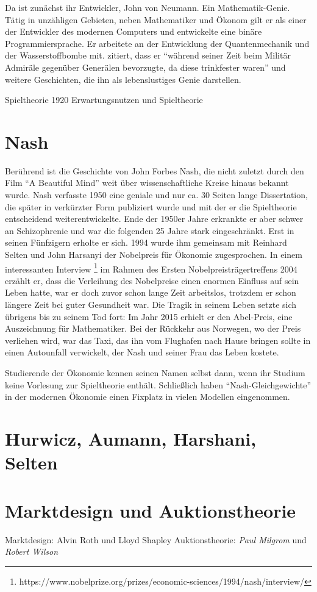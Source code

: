 Da ist zunächst ihr Entwickler, John von Neumann. Ein Mathematik-Genie. Tätig in unzähligen Gebieten, neben Mathematiker und Ökonom gilt er als einer der Entwickler des modernen Computers und entwickelte eine binäre Programmiersprache. Er arbeitete an der Entwicklung der Quantenmechanik und der Wasserstoffbombe mit. \textcite[S. 232]{Bernstein1996} zitiert, dass er "`während seiner Zeit beim Militär Admiräle gegenüber Generälen bevorzugte, da diese trinkfester waren"' und weitere Geschichten, die ihn als lebenslustiges Genie darstellen. 


Spieltheorie 1920
Erwartungsnutzen und Spieltheorie


\section{Nash}
Berührend ist die Geschichte von John Forbes Nash, die nicht zuletzt durch den Film "`A Beautiful Mind"' weit über wissenschaftliche Kreise hinaus bekannt wurde. Nash verfasste 1950 eine geniale und nur ca. 30 Seiten lange Dissertation, die später in verkürzter Form publiziert wurde \parencite{Nash1951} und mit der er die Spieltheorie entscheidend weiterentwickelte. Ende der 1950er Jahre erkrankte er aber schwer an Schizophrenie und war die folgenden 25 Jahre stark eingeschränkt. Erst in seinen Fünfzigern erholte er sich. 1994 wurde ihm gemeinsam mit Reinhard Selten und John Harsanyi der Nobelpreis für Ökonomie zugesprochen. In einem interessanten Interview \parencite{Nash2004}\footnote{https://www.nobelprize.org/prizes/economic-sciences/1994/nash/interview/} im Rahmen des Ersten Nobelpreisträgertreffens 2004 erzählt er, dass die Verleihung des Nobelpreise einen enormen Einfluss auf sein Leben hatte, war er doch zuvor schon lange Zeit arbeitslos, trotzdem er schon längere Zeit bei guter Gesundheit war. Die Tragik in seinem Leben setzte sich übrigens bis zu seinem Tod fort: Im Jahr 2015 erhielt er den Abel-Preis, eine Auszeichnung für Mathematiker. Bei der Rückkehr aus Norwegen, wo der Preis verliehen wird, war das Taxi, das ihn vom Flughafen nach Hause bringen sollte in einen Autounfall verwickelt, der Nash und seiner Frau das Leben kostete. 

Studierende der Ökonomie kennen seinen Namen selbst dann, wenn ihr Studium keine Vorlesung zur Spieltheorie enthält. Schließlich haben "`Nash-Gleichgewichte"' in der modernen Ökonomie einen Fixplatz in vielen Modellen eingenommen. 




\section{Hurwicz, Aumann, Harshani, Selten}

\section{Marktdesign und Auktionstheorie}

Marktdesign: Alvin Roth und Lloyd Shapley 
Auktionstheorie: \textit{Paul Milgrom} und \textit{Robert Wilson}



